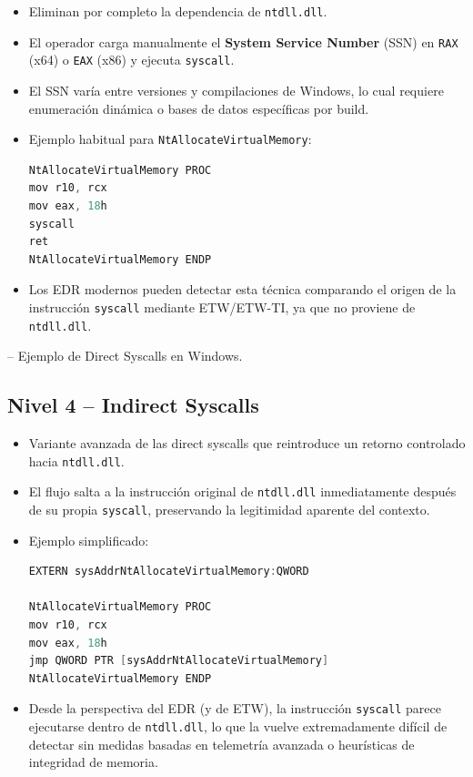 \begin{itemize}
\item Eliminan por completo la dependencia de \texttt{ntdll.dll}.
\item El operador carga manualmente el \textbf{System Service Number} (SSN) en \texttt{RAX} (x64) o \texttt{EAX} (x86) y ejecuta \texttt{syscall}.
\item El SSN varía entre versiones y compilaciones de Windows, lo cual requiere enumeración dinámica o bases de datos específicas por build.
\item Ejemplo habitual para \texttt{NtAllocateVirtualMemory}:
\begin{lstlisting}[language=C]
NtAllocateVirtualMemory PROC
mov r10, rcx
mov eax, 18h
syscall
ret
NtAllocateVirtualMemory ENDP
\end{lstlisting}
\item Los EDR modernos pueden detectar esta técnica comparando el origen de la instrucción \texttt{syscall} mediante ETW/ETW-TI, ya que no proviene de \texttt{ntdll.dll}.
\end{itemize}

\cite{ref:directsyscalls} – Ejemplo de Direct Syscalls en Windows.  

\subsection{Nivel 4 – Indirect Syscalls}

\begin{itemize}
\item Variante avanzada de las direct syscalls que reintroduce un retorno controlado hacia \texttt{ntdll.dll}.
\item El flujo salta a la instrucción original de \texttt{ntdll.dll} inmediatamente después de su propia \texttt{syscall}, preservando la legitimidad aparente del contexto.
\item Ejemplo simplificado:
\begin{lstlisting}[language=C]
EXTERN sysAddrNtAllocateVirtualMemory:QWORD

NtAllocateVirtualMemory PROC
mov r10, rcx
mov eax, 18h
jmp QWORD PTR [sysAddrNtAllocateVirtualMemory]
NtAllocateVirtualMemory ENDP
\end{lstlisting}
\item Desde la perspectiva del EDR (y de ETW), la instrucción \texttt{syscall} parece ejecutarse dentro de \texttt{ntdll.dll}, lo que la vuelve extremadamente difícil de detectar sin medidas basadas en telemetría avanzada o heurísticas de integridad de memoria.
\end{itemize}


